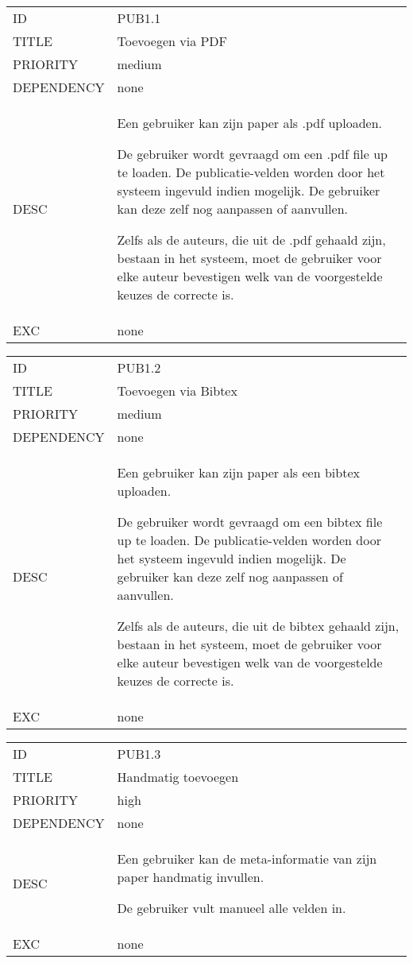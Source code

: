 \begin{longtable}{lp{10cm}}
ID           & PUB1.1\\
TITLE        & Toevoegen via PDF\\
PRIORITY     & medium\\
DEPENDENCY   & none\\
DESC         & Een gebruiker kan zijn paper als .pdf uploaden.

De gebruiker wordt gevraagd om een .pdf file up te loaden. De publicatie-velden worden door het systeem ingevuld indien mogelijk. De gebruiker kan deze zelf nog aanpassen of aanvullen.

Zelfs als de auteurs, die uit de .pdf gehaald zijn, bestaan in het systeem, moet de gebruiker voor elke auteur bevestigen welk van de voorgestelde keuzes de correcte is.\\
EXC          & none

\end{longtable}

\begin{longtable}{lp{10cm}}
ID           & PUB1.2\\
TITLE        & Toevoegen via Bibtex\\
PRIORITY     & medium\\
DEPENDENCY   & none\\
DESC         & Een gebruiker kan zijn paper als een bibtex uploaden.

De gebruiker wordt gevraagd om een bibtex file up te loaden. De publicatie-velden worden door het systeem ingevuld indien mogelijk. De gebruiker kan deze zelf nog aanpassen of aanvullen.

Zelfs als de auteurs, die uit de bibtex gehaald zijn, bestaan in het systeem, moet de gebruiker voor elke auteur bevestigen welk van de voorgestelde keuzes de correcte is.\\
EXC          & none
\end{longtable}

\begin{longtable}{lp{10cm}}
ID           & PUB1.3\\
TITLE        & Handmatig toevoegen\\
PRIORITY     & high\\
DEPENDENCY   & none\\
DESC         & Een gebruiker kan de meta-informatie van zijn paper handmatig invullen. 

De gebruiker vult manueel alle velden in.\\
EXC          & none
\end{longtable}

